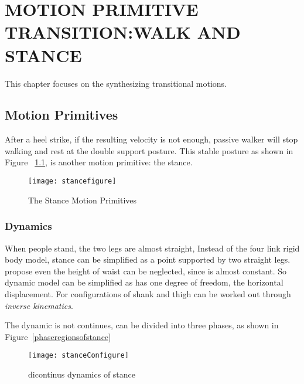 
\chapter{MOTION PRIMITIVE TRANSITION:WALK AND STANCE}
\label{chap:stance}
    \graphicspath{{WalkStance/WalkStanceFigs/EPS/}{WalkStance/WalkStanceFigs/}}

This chapter focuses on the synthesizing transitional motions.



    
    




\section{Motion Primitives}
After a  heel strike, if the resulting velocity is not enough, passive walker will stop walking and rest at the double support posture.
This stable posture as shown in Figure ~\ref{fig:bipedalstance}, is another motion primitive: the stance. 

\begin{figure}[!htbp]
  \begin{center}
      \texttt{[image: stancefigure]}
    \caption{The Stance Motion Primitives}
    \label{fig:bipedalstance}
\end{center}
\end{figure}


\subsection{Dynamics}
When people stand, the two legs are almost straight, 
Instead of the four link rigid body model, stance can be simplified as a point supported by two straight legs. 
\citet{stephens2009modeling} propose even the height of waist can be neglected, since is almost constant.
So dynamic model can be simplified as has one degree of freedom, the horizontal displacement.
For configurations of shank and thigh can be worked out through \emph{inverse kinematics}.
 




The dynamic is not continues, can be divided into three phases, as shown in Figure~\ref{phaseregionsofstance}

\begin{figure}[!htbp]
  \begin{center}
     \texttt{[image: stanceConfigure]}
    \caption{dicontinus dynamics of stance}
    \label{fig:phaseregionsofstance}
\end{center}
\end{figure}



